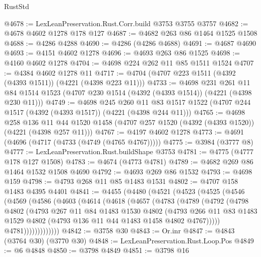 \begin{lexlean}{RustStd}
\begin{coremodule}
{\begin{coremodule}
{{{{{{{{{{{{{{{{{{{{{{{{{{{{{{{@4678 := LexLeanPreservation.Rust.Corr.build @3753 @3755 @3757
@4682 := @4678 @4602 @1278 @178 @127
@4687 := @4682 @263 @86 @1464 @1525 @1508
@4688 := @4286 @4288
@4690 := @4286 (@4286 @4688)
@4691 := @4687 @4690
@4693 := @4151 @4602 @1278
@4696 := @4693 @263 @86 @1525
@4698 := @4160 @4602 @1278
@4704 := @4698 @224 @262 @11 @85 @1511 @1524
@4707 := @4384 @4602 @1278 @11
@4717 := @4704 (@4707 @223 @1511 (@4392 (@4393 @1511)) (@4221 (@4398 @223 @11)))
@4733 := @4698
    @231
    @261
    @11
    @84
    @1514
    @1523
    (@4707 @230 @1514 (@4392 (@4393 @1514)) (@4221 (@4398 @230 @11)))
@4749 := @4698
    @245
    @260
    @11
    @83
    @1517
    @1522
    (@4707 @244 @1517 (@4392 (@4393 @1517)) (@4221 (@4398 @244 @11)))
@4765 := @4698
    @258
    @136
    @11
    @44
    @1520
    @1458
    (@4707 @257 @1520 (@4392 (@4393 @1520)) (@4221 (@4398 @257 @11)))
@4767 := @4197 @4602 @1278
@4773 := @4691 (@4696 (@4717 (@4733 (@4749 (@4765 @4767)))))
@4775 := @3984 (@3777 @8)
@4777 := LexLeanPreservation.Rust.buildShape @3753
@4781 := @4775 (@4777 @178 @127 @1508)
@4783 := @4674 (@4773 @4781)
@4789 := @4682 @269 @86 @1464 @1532 @1508 @4690
@4792 := @4693 @269 @86 @1532
@4793 := @4698 @159
@4798 := @4793 @268 @11 @85 @1483 @1531
@4802 := @4707 @158 @1483 @4395 @4401
@4841 := @4455
    (@4480
      (@4521
        (@4523
          (@4525
            (@4546
              (@4569
                (@4586
                  (@4603
                    (@4614
                      (@4618
                        (@4657
                          (@4783
                            (@4789
                              (@4792
                                (@4798
                                  @4802
                                  (@4793
                                    @267
                                    @11
                                    @84
                                    @1483
                                    @1530
                                    @4802
                                    (@4793
                                      @266
                                      @11
                                      @83
                                      @1483
                                      @1529
                                      @4802
                                      (@4793 @136 @11 @44 @1483 @1458 @4802 @4767)))))
                              @4781)))))))))))))
@4842 := @3758 @30
@4843 := Or.inr
@4847 := @4843 (@3764 @30) (@3770 @30)
@4848 := LexLeanPreservation.Rust.Loop.Pos
@4849 := @6 @4848
@4850 := @3798 @4849
@4851 := @3798 @16
}}}}}}}}}}}}}}}}}}}}}}}}}}}}}}}
\end{coremodule}}
\end{coremodule}
\end{lexlean}
